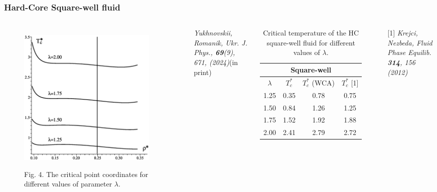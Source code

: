 \documentclass[8pt]{beamer}
\begin{document}
	\fi
	
	\begin{frame}
		\frametitle{Hard-Core Square-well fluid}
		
		\begin{columns}
			\begin{figure}[htbp]
				\includegraphics[width=0.9\textwidth,angle=0]{cp_coord} \\
				\parbox{0.8\textwidth}{\caption*{Fig. 4. The critical point coordinates for different values of parameter $\lambda$.
				}}
			\end{figure}
			
			\textit{Yukhnovskii, Romanik, Ukr. J. Phys., {\bf 69}(9), 671, (2024)}(in print)
			
			
			\begin{table}[h]
				\noindent\caption{Critical temperature of the HC square-well fluid for different values of $\lambda$.}\vskip3mm
				\begin{tabular}{|c|c|c|c|}
					\hline
					\multicolumn{4}{|c|}{Square-well}\\
					\hline
					$\lambda$ & $T_c^*$& $T_c^*$ (WCA) & $T_c^*$ [1] \\
					\hline
					1.25 & 0.35 & 0.78 & 0.75 \\
					1.50 & 0.84 & 1.26 & 1.25 \\
					1.75 & 1.52 & 1.92 & 1.88 \\
					2.00 & 2.41 & 2.79 & 2.72 \\
					\hline
				\end{tabular}
			\end{table}
			
			[1] \textit{Krejci, Nezbeda, Fluid Phase Equilib. \textbf{314}, 156 (2012)}
			
		\end{columns}
		
	\end{frame}
	
\end{document}
